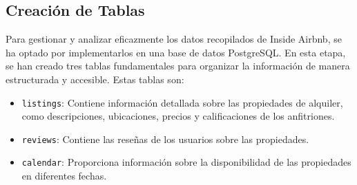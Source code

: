 \subsection{Creación de Tablas}

Para gestionar y analizar eficazmente los datos recopilados de Inside Airbnb, se ha optado por implementarlos en una base de datos PostgreSQL. En esta etapa, se han creado tres tablas fundamentales para organizar la información de manera estructurada y accesible. Estas tablas son:

\begin{itemize}
    \item \texttt{listings}: Contiene información detallada sobre las propiedades de alquiler, como descripciones, ubicaciones, precios y calificaciones de los anfitriones.
    \item \texttt{reviews}: Contiene las reseñas de los usuarios sobre las propiedades.
    \item \texttt{calendar}: Proporciona información sobre la disponibilidad de las propiedades en diferentes fechas.
\end{itemize}

